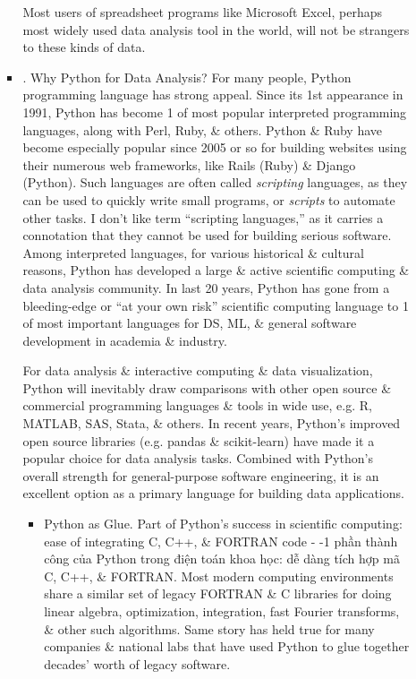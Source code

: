 \documentclass{article}
\begin{document}
\begin{enumerate}
\begin{itemize}
\begin{itemize}
			Most users of spreadsheet programs like Microsoft Excel, perhaps most widely used data analysis tool in the world, will not be strangers to these kinds of data.
			\item {. Why Python for Data Analysis?} For many people, Python programming language has strong appeal. Since its 1st appearance in 1991, Python has become 1 of most popular interpreted programming languages, along with Perl, Ruby, \& others. Python \& Ruby have become especially popular since 2005 or so for building websites using their numerous web frameworks, like Rails (Ruby) \& Django (Python). Such languages are often called {\it scripting} languages, as they can be used to quickly write small programs, or {\it scripts} to automate other tasks. I don't like term ``scripting languages,'' as it carries a connotation that they cannot be used for building serious software. Among interpreted languages, for various historical \& cultural reasons, Python has developed a large \& active scientific computing \& data analysis community. In last 20 years, Python has gone from a bleeding-edge or ``at your own risk'' scientific computing language to 1 of most important languages for DS, ML, \& general software development in academia \& industry.
			
			For data analysis \& interactive computing \& data visualization, Python will inevitably draw comparisons with other open source \& commercial programming languages \& tools in wide use, e.g. R, MATLAB, SAS, Stata, \& others. In recent years, Python's improved open source libraries (e.g. pandas \& scikit-learn) have made it a popular choice for data analysis tasks. Combined with Python's overall strength for general-purpose software engineering, it is an excellent option as a primary language for building data applications.
			\begin{itemize}
				\item {\sf Python as Glue.} Part of Python's success in scientific computing: ease of integrating C, C++, \& FORTRAN code - -1 phần thành công của Python trong điện toán khoa học: dễ dàng tích hợp mã C, C++, \& FORTRAN. Most modern computing environments share a similar set of legacy FORTRAN \& C libraries for doing linear algebra, optimization, integration, fast Fourier transforms, \& other such algorithms. Same story has held true for many companies \& national labs that have used Python to glue together decades' worth of legacy software.
				

\end{itemize}
\end{itemize}
\end{itemize}
\end{enumerate}
\end{document}

